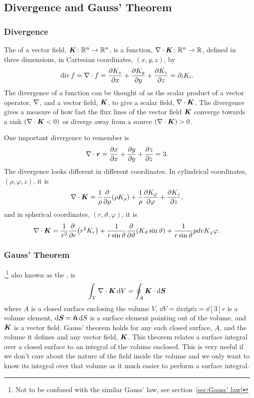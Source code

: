     \subsection{Divergence and Gauss' Theorem}
    \subsubsection{Divergence}
    The  of a vector field, \(\bm{K}\colon\mathbb{R}^n\to\mathbb{R}^n\), is a function, \(\nabla\cdot\bm{K}\colon\mathbb{R}^n\to\mathbb{R}\), defined in three dimensions, in Cartesian coordinates, \((x, y, z)\), by
    \[\operatorname{div}f = \nabla\cdot f = \pdv{K_x}{x} + \pdv{K_y}{y} + \pdv{K_z}{z} = \partial_i K_i.\]
    The divergence of a function can be thought of as the scalar product of a vector operator, \(\nabla\), and a vector field, \(\bm{K}\), to give a scalar field, \(\nabla\cdot\bm{K}\).
    The divergence gives a measure of how fast the flux lines of the vector field \(\bm{K}\) converge towards a sink \((\nabla\cdot\bm{K} < 0)\) or diverge away from a source \((\nabla\cdot\bm{K}) > 0\).
    
    One important divergence to remember is
    \[\nabla\cdot\bm{r} = \pdv{x}{x} + \pdv{y}{y} + \pdv{z}{z} = 3.\]
    The divergence looks different in different coordinates.
    In cylindrical coordinates, \((\rho, \varphi, z)\), it is
    \[\nabla\cdot\bm{K} = \frac{1}{\rho}\pdv{\rho}(\rho K_\rho) + \frac{1}{\rho}\pdv{K_\varphi}{\varphi} + \pdv{K_z}{z},\]
    and in spherical coordinates, \((r, \vartheta, \varphi)\), it is
    \[\nabla\cdot\bm{K} = \frac{1}{r^2}\pdv{r}(r^2K_r) + \frac{1}{r\sin\vartheta}\pdv{\vartheta}(K_\vartheta\sin\vartheta) + \frac{1}{r\sin\vartheta}\\pdv{K_\varphi}{\varphi}.\]
    
    \subsubsection{Gauss' Theorem}
    ,\footnote{Not to be confused with the similar Gauss' law, see section~\ref{sec:Gauss' law}} also known as the , is
    \[\int_V\nabla\cdot\bm{K}\,\dd V = \oint_A\bm{K}\cdot\dd\bm{S}\]
    where \(A\) is a closed surface enclosing the volume \(V\), \(\dd{V} = \dd{x}\dd{y}\dd{z} = \dd[3]{r}\) is a volume element, \(\dd{\bm{S}} = \bm{\hat{n}}\dd{S}\) is a surface element pointing out of the volume, and \(\bm{K}\) is a vector field.
    Gauss' theorem holds for any such closed surface, \(A\), and the volume it defines and any vector field, \(\bm{K}\).
    This theorem relates a surface integral over a closed surface to an integral of the volume enclosed.
    This is very useful if we don't care about the nature of the field inside the volume and we only want to know its integral over that volume as it much easier to perform a surface integral.
    
